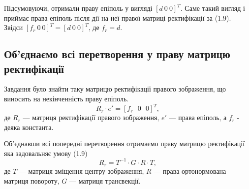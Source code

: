 Підсумовуючи, отримали праву епіполь у вигляді ${[d \: 0 \: 0]}^T$. Саме такий 
вигляд і приймає права епіполь після дії на неї правої матриці ректифікації
за (1.9). Звідси ${[f_r \: 0 \: 0]}^T = {[d \: 0 \: 0]}^T$, де $f_r = d$.


\subsection{Об'єднаємо всі перетворення у праву матрицю ректифікації}
Завдання було знайти таку матрицю ректифікації правого зображення, що 
виносить на некінченність праву епіполь. 
\begin{equation}
	R_r \cdot e' = {[f_r \:\:\: 0 \:\:\: 0]}^T,
\end{equation}
де $R_r$ --- матриця ректифікації правого зображення, $e'$ --- права епіполь, а 
$f_r$ - деяка константа.

Об'єднавши всі попередні перетворення отримаємо праву матрицю ректифікації яка 
задовальняє умову (1.9)
\begin{equation}
	R_r = T^{-1} \cdot G \cdot R \cdot T,
\end{equation}
де $T$ --- матриця зміщення центру зображення, $R$ --- права ортонормована
матриця повороту, $G$ --- матриця трансвекції.

